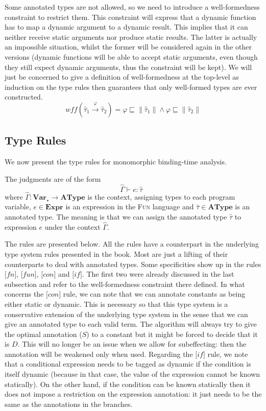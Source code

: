 \documentclass[a4wide,12pt]{article}
\theoremstyle{definition}
\theoremstyle{plain}
\theoremstyle{remark}
\def\Expr{\mathbf{Expr}}
\def\Var {\mathbf{Var}}
\def\AType{\mathbf{AType}}
\def\sqleq{\sqsubseteq}
\def\htau{\hat{\tau}}
\def\HGamma{\hat{\Gamma}}
\def\judge#1#2#3{#1 \vdash #2 : #3\;\;}
\def\annot#1{\|#1\|}
\begin{document}
Some annotated types are not allowed, so we need to introduce a well-formedness
constraint to restrict them. This constraint will express that a dynamic function
has to map a dynamic argument to a dynamic result. This implies that
it can neither receive static arguments nor produce static results. The latter is actually
an impossible situation, whilst the former will be considered again in the other versions
(dynamic functions will be able to accept static arguments, even though they still expect dynamic arguments,
thus the constraint will be kept).
We will just be concerned to give a definition of well-formedness at the top-level as
induction on the type rules then guarantees that only
well-formed types are ever constructed.
\[
wff(\htau_1 \overset{\varphi}{\to} \htau_2) 
= \varphi \sqleq \annot{\htau_1}
 \land   \varphi \sqleq \annot{\htau_2}
\]

\subsection{Type Rules}

We now present the type rules for monomorphic binding-time analysis.

The judgments are of the form
\[\judge{\HGamma}{e}{\htau}\]
where $\HGamma: \Var_\star \to \AType$ is the context, assigning types to each program variable, 
$e \in \Expr$ is an expression in the \textsc{Fun} language and $\htau \in \AType$ is an annotated type.
The meaning is that we can assign the annotated type $\htau$ to expression $e$ under the context $\HGamma$. 


The rules are presented below. All the rules 
have a counterpart in the underlying type system rules presented in the book.
Most are just a lifting of their counterparts to deal with annotated types.
Some specificities show up in the rules
$\lbrack fn \rbrack$,
$\lbrack fun \rbrack$,
$\lbrack con \rbrack$ and
$\lbrack if \rbrack$. 
The first two were already discussed in the last subsection and refer to 
the well-formedness constraint there defined.
In what concerns the $\lbrack con \rbrack$ rule, we can note that we can annotate constants 
as being either static or dynamic. This is necessary so that this type system
is a conservative extension of the underlying type system in the sense that 
we can give an annotated type to each valid term. The algorithm will always try to give the
optimal annotation ($S$) to a constant but it might be forced to decide that it is $D$. 
This will no longer be an issue when we allow for subeffecting: then the annotation will be weakened
only when used. Regarding the $\lbrack if \rbrack$ rule, we note that a conditional expression
needs to be tagged as dynamic if the condition is itself dynamic (because in that case,
the value of the expression cannot be known statically). On the other hand, if the condition
can be known statically then it does not impose a restriction on the expression annotation: it
just needs to be the same as the annotations in the branches.
\end{document}
